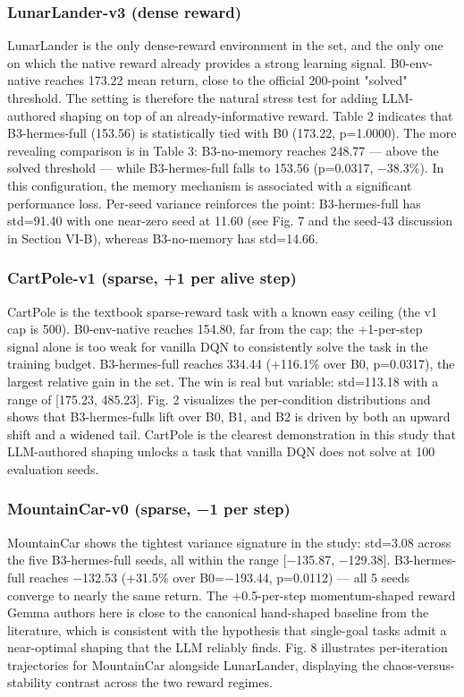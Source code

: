 \documentclass[conference,letterpaper,10pt]{IEEEtran}
\begin{document}
\subsubsection{LunarLander-v3 (dense reward)}

LunarLander is the only dense-reward environment in the set, and the only one on which the native reward already provides a strong learning signal. B0-env-native reaches 173.22 mean return, close to the official 200-point "solved" threshold. The setting is therefore the natural stress test for adding LLM-authored shaping on top of an already-informative reward. Table 2 indicates that B3-hermes-full (153.56) is statistically tied with B0 (173.22, p=1.0000). The more revealing comparison is in Table 3: B3-no-memory reaches 248.77 --- above the solved threshold --- while B3-hermes-full falls to 153.56 (p=0.0317, −38.3\%). In this configuration, the memory mechanism is associated with a significant performance loss. Per-seed variance reinforces the point: B3-hermes-full has std=91.40 with one near-zero seed at 11.60 (see Fig. 7 and the seed-43 discussion in Section VI-B), whereas B3-no-memory has std=14.66.

\subsubsection{CartPole-v1 (sparse, +1 per alive step)}

CartPole is the textbook sparse-reward task with a known easy ceiling (the v1 cap is 500). B0-env-native reaches 154.80, far from the cap; the +1-per-step signal alone is too weak for vanilla DQN to consistently solve the task in the training budget. B3-hermes-full reaches 334.44 (+116.1\% over B0, p=0.0317), the largest relative gain in the set. The win is real but variable: std=113.18 with a range of {[}175.23, 485.23{]}. Fig. 2 visualizes the per-condition distributions and shows that B3-hermes-full\textquotesingle s lift over B0, B1, and B2 is driven by both an upward shift and a widened tail. CartPole is the clearest demonstration in this study that LLM-authored shaping unlocks a task that vanilla DQN does not solve at 100 evaluation seeds.

\subsubsection{MountainCar-v0 (sparse, −1 per step)}

MountainCar shows the tightest variance signature in the study: std=3.08 across the five B3-hermes-full seeds, all within the range {[}−135.87, −129.38{]}. B3-hermes-full reaches −132.53 (+31.5\% over B0=−193.44, p=0.0112) --- all 5 seeds converge to nearly the same return. The +0.5-per-step momentum-shaped reward Gemma authors here is close to the canonical hand-shaped baseline from the literature, which is consistent with the hypothesis that single-goal tasks admit a near-optimal shaping that the LLM reliably finds. Fig. 8 illustrates per-iteration trajectories for MountainCar alongside LunarLander, displaying the chaos-versus-stability contrast across the two reward regimes.
\end{document}
